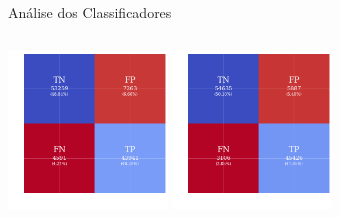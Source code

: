 \begin{frame}[c]{Análise dos Classificadores}
\begin{columns}[c]
\begin{column}{0.48\textwidth}
            \centering
            \includegraphics[width=\linewidth, height=4.2cm, keepaspectratio]{images/confusion_matrix_knn.png}
            \vspace{0.5cm}
            \includegraphics[width=\linewidth, height=4.2cm, keepaspectratio]{images/confusion_matrix_rf.png}
        \end{column}
    \end{columns}
\end{frame}

